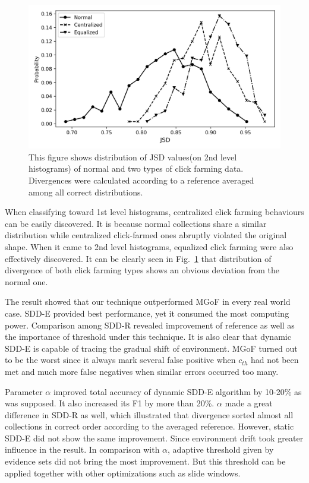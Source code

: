 \documentclass{article}
\begin{document}
			\begin{figure}[!t]
				\centering
				\includegraphics[width=\linewidth]{fig/RawOverview2nd.png}
				\caption{This figure shows distribution of JSD values(on 2nd level histograms) of normal and two types of click farming data. Divergences were calculated according to a reference averaged among all correct distributions.}
				\label{fig:raw-overview}
			\end{figure}
	
			When classifying toward 1st level histograms, centralized click farming behaviours can be easily discovered. It is because normal collections share a similar distribution while centralized click-farmed ones abruptly violated the original shape.
			When it came to 2nd level histograms, equalized click farming were also effectively discovered. It can be clearly seen in Fig.~\ref{fig:raw-overview} that distribution of divergence of both click farming types shows an obvious deviation from the normal one.
			
			The result showed that our technique outperformed MGoF in every real world case.
			SDD-E provided best performance, yet it consumed the most computing power. Comparison among SDD-R revealed improvement of reference as well as the importance of threshold under this technique. It is also clear that dynamic SDD-E is capable of tracing the gradual shift of environment. MGoF turned out to be the worst since it always mark several false positive when $c_{th}$ had not been met and much more false negatives when similar errors occurred too many. 
			
			Parameter $\alpha$ improved total accuracy of dynamic SDD-E algorithm by 10-20\% as was supposed. It also increased its F1 by more than 20\%. $\alpha$ made a great difference in SDD-R as well, which illustrated that divergence sorted almost all collections in correct order according to the averaged reference. However, static SDD-E did not show the same improvement. Since environment drift took greater influence in the result. In comparison with $\alpha$, adaptive threshold given by evidence sets did not bring the most improvement. But this threshold can be applied together with other optimizations such as slide windows.
	
\end{document}
